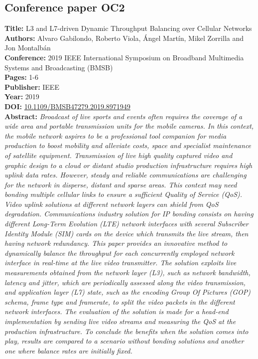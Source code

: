 \subsection{Conference paper OC2}
\label{chap:BMSB2019-1}
\textbf{Title:} L3 and L7-driven Dynamic Throughput Balancing over Cellular Networks \\
\textbf{Authors:} Alvaro Gabilondo, Roberto Viola, \'Angel Mart\'in, Mikel Zorrilla and Jon Montalbán \\
\textbf{Conference:} 2019 IEEE International Symposium on Broadband Multimedia Systems and Broadcasting (BMSB) \\
\textbf{Pages:} 1-6 \\
\textbf{Publisher:} IEEE \\
\textbf{Year:} 2019 \\
\textbf{DOI:} \url{10.1109/BMSB47279.2019.8971949} \\
\textbf{Abstract:} \textit{Broadcast of live sports and events often requires the coverage of a wide area and portable transmission units for the mobile cameras. In this context, the mobile network aspires to be a professional tool companion for media production to boost mobility and alleviate costs, space and specialist maintenance of satellite equipment. Transmission of live high quality captured video and graphic design to a cloud or distant studio production infrastructure requires high uplink data rates. However, steady and reliable communications are challenging for the network in disperse, distant and sparse areas. This context may need bonding multiple cellular links to ensure a sufficient Quality of Service (QoS). Video uplink solutions at different network layers can shield from QoS degradation. Communications industry solution for IP bonding consists on having different Long-Term Evolution (LTE) network interfaces with several Subscriber Identity Module (SIM) cards on the device which transmits the live stream, then having network redundancy. This paper provides an innovative method to dynamically balance the throughput for each concurrently employed network interface in real-time at the live video transmitter. The solution exploits live measurements obtained from the network layer (L3), such as network bandwidth, latency and jitter, which are periodically assessed along the video transmission, and application layer (L7) state, such as the encoding Group Of Pictures (GOP) schema, frame type and framerate, to split the video packets in the different network interfaces. The evaluation of the solution is made for a head-end implementation by sending live video streams and measuring the QoS at the production infrastructure. To conclude the benefits when the solution comes into play, results are compared to a scenario without bonding solutions and another one where balance rates are initially fixed.} \\
\hrulefill

